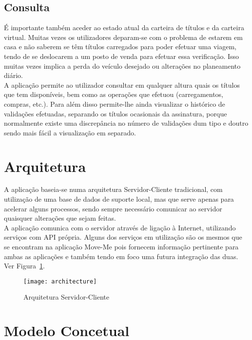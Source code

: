 \subsection{Consulta}

É importante também aceder ao estado atual da carteira de títulos e da carteira virtual. Muitas vezes os utilizadores deparam-se com o problema de estarem em casa e não saberem se têm títulos carregados para poder efetuar uma viagem, tendo de se deslocarem a um posto de venda para efetuar essa verificação. Isso muitas vezes implica a perda do veículo desejado ou alterações no planeamento diário.
\\A aplicação permite ao utilizador consultar em qualquer altura quais os títulos que tem disponíveis, bem como as operações que efetuou (carregamentos, compras, etc.). Para além disso permite-lhe ainda visualizar o histórico de validações efetuadas, separando os títulos ocasionais da assinatura, porque normalmente existe uma discrepância no número de validações dum tipo e doutro sendo mais fácil a visualização em separado.

\section{Arquitetura}

A aplicação baseia-se numa arquitetura Servidor-Cliente tradicional, com utilização de uma base de dados de suporte local, mas que serve apenas para acelerar alguns processos, sendo sempre necessário comunicar ao servidor quaisquer alterações que sejam feitas.
\\A aplicação comunica com o servidor através de ligação à Internet, utilizando serviços \web com API própria. Alguns dos serviços em utilização são os mesmos que se encontram na aplicação Move-Me pois fornecem informação pertinente para ambas as aplicações e também tendo em foco uma futura integração das duas. Ver Figura~\ref{fig:architecture}.

\begin{figure}[t]
  \begin{center}
    \leavevmode
    \texttt{[image: architecture]}
    \caption{Arquitetura Servidor-Cliente}
    \label{fig:architecture}
  \end{center}
\end{figure}

\section{Modelo Concetual}

